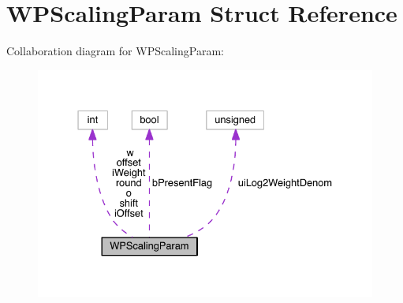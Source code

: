 \hypertarget{struct_w_p_scaling_param}{}\section{W\+P\+Scaling\+Param Struct Reference}
\label{struct_w_p_scaling_param}


Collaboration diagram for W\+P\+Scaling\+Param\+:
\nopagebreak
\begin{figure}[H]
\begin{center}
\leavevmode
\includegraphics[width=331pt]{d7/d34/struct_w_p_scaling_param__coll__graph}
\end{center}
\end{figure}
